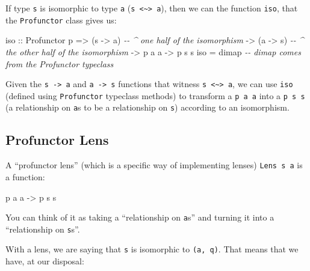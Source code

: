\documentclass[]{article}
\newenvironment{Shaded}{}{}
\newcommand{\CommentTok}[1]{\textcolor[rgb]{0.38,0.63,0.69}{\textit{#1}}}
\newcommand{\DataTypeTok}[1]{\textcolor[rgb]{0.56,0.13,0.00}{#1}}
\newcommand{\NormalTok}[1]{#1}
\newcommand{\OtherTok}[1]{\textcolor[rgb]{0.00,0.44,0.13}{#1}}
\begin{document}
If type \texttt{s} is isomorphic to type \texttt{a}
(\texttt{s\ \textless{}\textasciitilde{}\textgreater{}\ a}), then we can the
function \texttt{iso}, that the \texttt{Profunctor} class gives us:

\begin{Shaded}
\begin{Highlighting}[]
\OtherTok{iso ::} \DataTypeTok{Profunctor}\NormalTok{ p}
    \OtherTok{=\textgreater{}}\NormalTok{ (s }\OtherTok{{-}\textgreater{}}\NormalTok{ a)         }\CommentTok{{-}{-} \^{} one half of the isomorphism}
    \OtherTok{{-}\textgreater{}}\NormalTok{ (a }\OtherTok{{-}\textgreater{}}\NormalTok{ s)         }\CommentTok{{-}{-} \^{} the other half of the isomorphism}
    \OtherTok{{-}\textgreater{}}\NormalTok{ p a a}
    \OtherTok{{-}\textgreater{}}\NormalTok{ p s s}
\NormalTok{iso }\OtherTok{=}\NormalTok{ dimap         }\CommentTok{{-}{-} \textasciigrave{}dimap\textasciigrave{} comes from the \textasciigrave{}Profunctor\textasciigrave{} typeclass}
\end{Highlighting}
\end{Shaded}

Given the \texttt{s\ -\textgreater{}\ a} and \texttt{a\ -\textgreater{}\ s}
functions that witness
\texttt{s\ \textless{}\textasciitilde{}\textgreater{}\ a}, we can use
\texttt{iso} (defined using \texttt{Profunctor} typeclass methods) to transform
a \texttt{p\ a\ a} into a \texttt{p\ s\ s} (a relationship on \texttt{a}s to be
a relationship on \texttt{s}) according to an isomorphism.

\subsection{Profunctor Lens}\label{profunctor-lens}

A ``profunctor lens'' (which is a specific way of implementing lenses)
\texttt{Lens\textquotesingle{}\ s\ a} is a function:

\begin{Shaded}
\begin{Highlighting}[]
\NormalTok{p a a }\OtherTok{{-}\textgreater{}}\NormalTok{ p s s}
\end{Highlighting}
\end{Shaded}

You can think of it as taking a ``relationship on \texttt{a}s'' and turning it
into a ``relationship on \texttt{s}s''.

With a lens, we are saying that \texttt{s} is isomorphic to \texttt{(a,\ q)}.
That means that we have, at our disposal:
\end{document}

